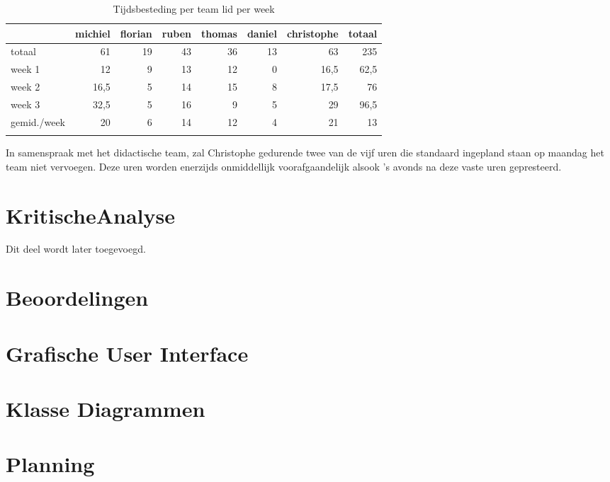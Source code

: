 \documentclass[12pt,a4paper]{report}
\begin{document}
\begin{longtable}{l r r r r r r r}
\caption{Tijdsbesteding per team lid per week} \\
\hline\hline
 & michiel & florian & ruben & thomas & daniel & christophe & totaal \\
\hline 
\endfirsthead
totaal & 61 & 19 & 43 & 36 & 13 & 63 & 235\\
\hline
week 1 & 12 & 9 & 13 & 12 & 0 & 16,5 & 62,5 \\
week 2 & 16,5 & 5 & 14 & 15 & 8 & 17,5 & 76 \\
week 3 & 32,5 & 5 & 16 & 9 & 5 & 29 & 96,5 \\
\hline
gemid./week & 20 & 6 & 14 & 12 & 4 & 21 & 13 \\
\label{tab:tijdsregistratie}
\end{longtable}

In samenspraak met het didactische team, zal Christophe gedurende twee van de vijf uren die standaard ingepland staan op maandag het team niet vervoegen. Deze uren worden enerzijds onmiddellijk voorafgaandelijk alsook 's avonds na deze vaste uren gepresteerd.

\chapter{KritischeAnalyse}

Dit deel wordt later toegevoegd.

\appendix

\chapter{Beoordelingen}

\chapter{Grafische User Interface}

\chapter{Klasse Diagrammen}


\chapter{Planning}
\label{appendix:planning}
\end{document}
